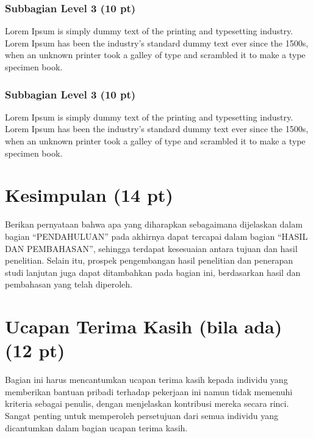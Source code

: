 \documentclass[10pt,a4paper]{article}
\begin{document}
\subsubsection{Subbagian Level 3 (10 pt)}
Lorem Ipsum is simply dummy text of the printing and typesetting industry. Lorem Ipsum has been the industry's standard dummy text ever since the 1500s, when an unknown printer took a galley of type and scrambled it to make a type specimen book.

\subsubsection{Subbagian Level 3 (10 pt)}
Lorem Ipsum is simply dummy text of the printing and typesetting industry. Lorem Ipsum has been the industry's standard dummy text ever since the 1500s, when an unknown printer took a galley of type and scrambled it to make a type specimen book.

\section{Kesimpulan (14 pt)}

Berikan pernyataan bahwa apa yang diharapkan sebagaimana dijelaskan dalam bagian ``PENDAHULUAN'' pada akhirnya dapat tercapai dalam bagian ``HASIL DAN PEMBAHASAN'', sehingga terdapat kesesuaian antara tujuan dan hasil penelitian. Selain itu, prospek pengembangan hasil penelitian dan penerapan studi lanjutan juga dapat ditambahkan pada bagian ini, berdasarkan hasil dan pembahasan yang telah diperoleh.

\section*{Ucapan Terima Kasih (bila ada) (12 pt)}

Bagian ini harus mencantumkan ucapan terima kasih kepada individu yang memberikan bantuan pribadi terhadap pekerjaan ini namun tidak memenuhi kriteria sebagai penulis, dengan menjelaskan kontribusi mereka secara rinci. Sangat penting untuk memperoleh persetujuan dari semua individu yang dicantumkan dalam bagian ucapan terima kasih.
\end{document}
